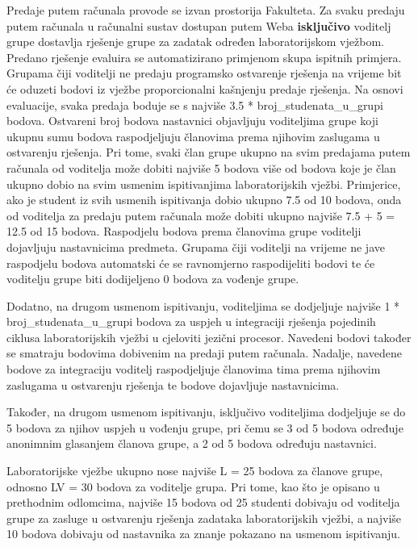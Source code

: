 \documentclass[times, 12pt, utf8]{book}
\begin{document}
Predaje putem računala provode se izvan prostorija Fakulteta.
Za svaku predaju putem računala u računalni sustav dostupan putem Weba \textbf{isključivo} voditelj grupe dostavlja rješenje grupe za zadatak određen laboratorijskom vježbom.
Predano rješenje evaluira se automatizirano primjenom skupa ispitnih primjera.
Grupama čiji voditelji ne predaju programsko ostvarenje rješenja na vrijeme bit će oduzeti bodovi iz vježbe proporcionalni kašnjenju predaje rješenja.
Na osnovi evaluacije, svaka predaja boduje se s najviše 3.5 * broj\_studenata\_u\_grupi bodova.
Ostvareni broj bodova nastavnici objavljuju voditeljima grupe koji ukupnu sumu bodova raspodjeljuju članovima prema njihovim zaslugama u ostvarenju rješenja.
Pri tome, svaki član grupe ukupno na svim predajama putem računala od voditelja može dobiti najviše 5 bodova više od bodova koje je član ukupno dobio na svim usmenim ispitivanjima laboratorijskih vježbi.
Primjerice, ako je student iz svih usmenih ispitivanja dobio ukupno 7.5 od 10 bodova, onda od voditelja za predaju putem računala može dobiti ukupno najviše 7.5 + 5 = 12.5 od 15 bodova. 
Raspodjelu bodova prema članovima grupe voditelji dojavljuju nastavnicima predmeta.
Grupama čiji voditelji na vrijeme ne jave raspodjelu bodova automatski će se ravnomjerno raspodijeliti bodovi te će voditelju grupe biti dodijeljeno 0 bodova za vođenje grupe.

Dodatno, na drugom usmenom ispitivanju, voditeljima se dodjeljuje najviše 1 * broj\_studenata\_u\_grupi bodova za uspjeh u integraciji rješenja pojedinih ciklusa laboratorijskih vježbi u cjeloviti jezični procesor.
Navedeni bodovi također se smatraju bodovima dobivenim na predaji putem računala.
Nadalje, navedene bodove za integraciju voditelj raspodjeljuje članovima tima prema njihovim zaslugama u ostvarenju rješenja te bodove dojavljuje nastavnicima.

Također, na drugom usmenom ispitivanju, isključivo voditeljima dodjeljuje se do 5 bodova za njihov uspjeh u vođenju grupe, pri čemu se 3 od 5 bodova određuje anonimnim glasanjem članova grupe, a 2 od 5 bodova određuju nastavnici.

Laboratorijske vježbe ukupno nose najviše L = 25 bodova za članove grupe, odnosno LV = 30 bodova za voditelje grupa.
Pri tome, kao što je opisano u prethodnim odlomcima, najviše 15 bodova od 25 studenti dobivaju od voditelja grupe za zasluge u ostvarenju rješenja zadataka laboratorijskih vježbi, a najviše 10 bodova dobivaju od nastavnika za znanje pokazano na usmenom ispitivanju.
\end{document}
